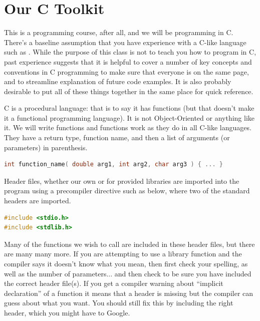 



\section*{Our C Toolkit}

This is a programming course, after all, and we will be programming in C. There's a baseline assumption that you have experience with a C-like language such as \Cpp. While the purpose of this class is not to teach you how to program in C, past experience  suggests that it is helpful to cover a number of key concepts and conventions in C programming to make sure that everyone is on the same page, and to streamline explanation of future code examples. It is also probably desirable to put all of these things together in the same place for quick reference.

C is a procedural language: that is to say it has functions (but that doesn't make it a functional programming language). It is not Object-Oriented or anything like it. We will write functions and functions work as they do in all C-like languages. They have a return type, function name, and then a list of arguments (or parameters) in parenthesis.

\begin{lstlisting}[language=C]
int function_name( double arg1, int arg2, char arg3 ) { ... }
\end{lstlisting}

Header files, whether our own or for provided libraries are imported into the program using a precompiler directive such as below, where two of the standard headers are imported.

\begin{lstlisting}[language=C]
#include <stdio.h>
#include <stdlib.h>
\end{lstlisting}

Many of the functions we wish to call are included in these header files, but there are many many more. If you are attempting to use a library function and the compiler says it doesn't know what you mean, then first check your spelling, as well as the number of parameters... and then check to be sure you have included the correct header file(s). If you get a compiler warning about ``implicit declaration'' of a function it means that a header is missing but the compiler can guess about what you want. You should still fix this by including the right header, which you might have to Google.

